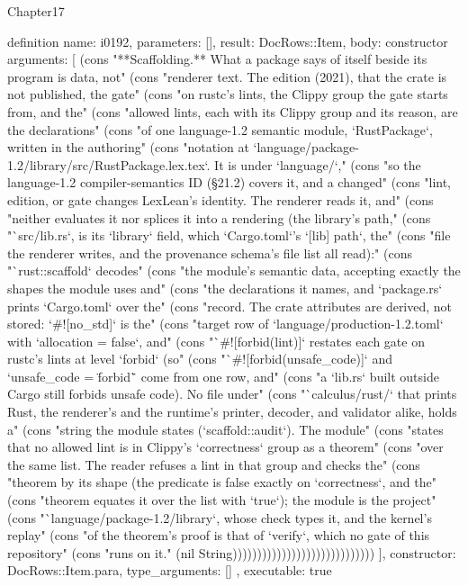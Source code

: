 \begin{lexlean}{Chapter17}
\begin{semanticmodule}
definition{
  name: i0192,
  parameters: [],
  result: DocRows::Item,
  body: constructor{
    arguments: [
      (cons "**Scaffolding.** What a package says of itself beside its program is data, not" (cons "renderer text. The edition (2021), that the crate is not published, the gate" (cons "on rustc's lints, the Clippy group the gate starts from, and the" (cons "allowed lints, each with its Clippy group and its reason, are the declarations" (cons "of one language-1.2 semantic module, `RustPackage`, written in the authoring" (cons "notation at `language/package-1.2/library/src/RustPackage.lex.tex`. It is under `language/`," (cons "so the language-1.2 compiler-semantics ID (§21.2) covers it, and a changed" (cons "lint, edition, or gate changes LexLean's identity. The renderer reads it, and" (cons "neither evaluates it nor splices it into a rendering (the library's path," (cons "`src/lib.rs`, is its `library` field, which `Cargo.toml`'s `[lib] path`, the" (cons "file the renderer writes, and the provenance schema's file list all read):" (cons "`rust::scaffold` decodes" (cons "the module's semantic data, accepting exactly the shapes the module uses and" (cons "the declarations it names, and `package.rs` prints `Cargo.toml` over the" (cons "record. The crate attributes are derived, not stored: `#![no_std]` is the" (cons "target row of `language/production-1.2.toml` with `allocation = false`, and" (cons "`#![forbid(lint)]` restates each gate on rustc's lints at level `forbid` (so" (cons "`#![forbid(unsafe_code)]` and `unsafe_code = \"forbid\"` come from one row, and" (cons "a `lib.rs` built outside Cargo still forbids unsafe code). No file under" (cons "`calculus/rust/` that prints Rust, the renderer's and the runtime's printer, decoder, and validator alike, holds a" (cons "string the module states (`scaffold::audit`). The module" (cons "states that no allowed lint is in Clippy's `correctness` group as a theorem" (cons "over the same list. The reader refuses a lint in that group and checks the" (cons "theorem by its shape (the predicate is false exactly on `correctness`, and the" (cons "theorem equates it over the list with `true`); the module is the project" (cons "`language/package-1.2/library`, whose check types it, and the kernel's replay" (cons "of the theorem's proof is that of `verify`, which no gate of this repository" (cons "runs on it." (nil String)))))))))))))))))))))))))))))
    ],
    constructor: DocRows::Item.para,
    type_arguments: []
  },
  executable: true
}


\end{semanticmodule}
\end{lexlean}
